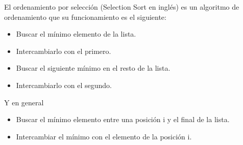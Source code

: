 El ordenamiento por selección (Selection Sort en inglés) es un algoritmo de ordenamiento que su funcionamiento es el siguiente:
\begin{itemize}
	\item Buscar el mínimo elemento de la lista.
	\item Intercambiarlo con el primero.
	\item Buscar el siguiente mínimo en el resto de la lista.
	\item Intercambiarlo con el segundo.
\end{itemize}

Y en general

\begin{itemize}
	\item Buscar el mínimo elemento entre una posición i y el final de la lista.
	\item Intercambiar el mínimo con el elemento de la posición i.
\end{itemize}